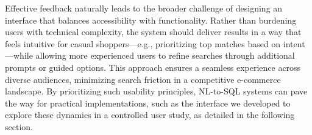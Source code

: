 \documentclass[../../submission.tex]{subfiles}
\begin{document}
Effective feedback naturally leads to the broader challenge of designing an interface that balances accessibility 
with functionality. Rather than burdening users with technical complexity, the system should deliver results in 
a way that feels intuitive for casual shoppers—e.g., prioritizing top matches based on intent—while allowing more 
experienced users to refine searches through additional prompts or guided options. This approach ensures a seamless 
experience across diverse audiences, minimizing search friction in a competitive e-commerce landscape. 
By prioritizing such usability principles, NL-to-SQL systems can pave the way for practical implementations, such 
as the interface we developed to explore these dynamics in a controlled user study, as detailed in the following section.
\end{document}

